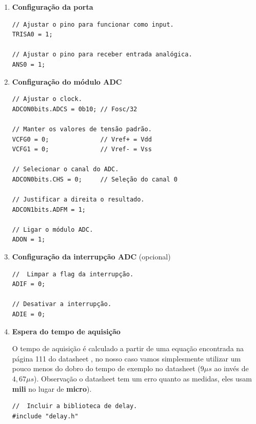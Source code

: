 \documentclass{article}
\begin{document}
\begin{enumerate}
    \item \textbf{Configuração da porta} \par

    \begin{lstlisting}[style = Matlab-editor, language = C2]
// Ajustar o pino para funcionar como input.
TRISA0 = 1;
    
// Ajustar o pino para receber entrada analógica.
ANS0 = 1;\end{lstlisting}
    
    \item \textbf{Configuração do módulo ADC} \par
    
    \begin{lstlisting}[style = Matlab-editor, language = C2]
// Ajustar o clock.
ADCON0bits.ADCS = 0b10; // Fosc/32
    
// Manter os valores de tensão padrão.
VCFG0 = 0;              // Vref+ = Vdd
VCFG1 = 0;              // Vref- = Vss
    
// Selecionar o canal do ADC.
ADCON0bits.CHS = 0;     // Seleção do canal 0
    
// Justificar a direita o resultado.
ADCON1bits.ADFM = 1;
    
// Ligar o módulo ADC.
ADON = 1;\end{lstlisting}
    
    \item \textbf{Configuração da interrupção ADC} (opcional) \par

    \begin{lstlisting}[style = Matlab-editor, language = C2]
//  Limpar a flag da interrupção.
ADIF = 0;
    
// Desativar a interrupção.
ADIE = 0;\end{lstlisting}

    
    \item \textbf{Espera do tempo de aquisição} \par
    O tempo de aquisição é calculado a partir de uma equação encontrada na página 111 do datasheet \cite{PICDatasheet}, no nosso caso vamos simplesmente utilizar um pouco menos do dobro do tempo de exemplo no datasheet ($9\mu s$ ao invés de $4,67\mu s$). Observação o datasheet tem um erro quanto as medidas, eles usam \textbf{mili} no lugar de \textbf{micro}).\par
    
    \begin{lstlisting}[style = Matlab-editor, language = C2]
//  Incluir a biblioteca de delay.
#include "delay.h"
    

\end{lstlisting}
\end{enumerate}
\end{document}
